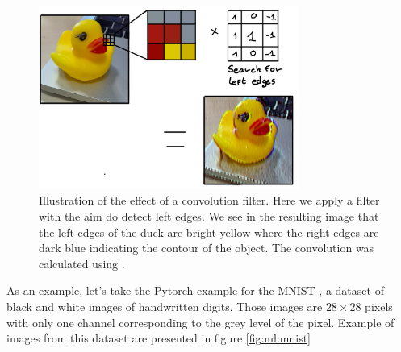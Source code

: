 \documentclass[../main.tex]{subfiles}
\begin{document}
\begin{figure}[ht]
  \centering
  \includegraphics[height=6cm]{images/ml/convolution_exammple.jpg}
  \caption{Illustration of the effect of a convolution filter. Here we apply a filter with the aim do detect left edges. We see in the resulting image that the left edges of the duck are bright yellow where the right edges are dark blue indicating the contour of the object. The convolution was calculated using \cite{allen_generic-github-userimage-convolution-playground_2024}.}
  \label{fig:ml:conv_filter}
\end{figure}

As an example, let's take the Pytorch \cite{ansel_pytorch_2024} example for the MNIST \cite{lecun_gradient-based_1998}, a dataset of black and white images of handwritten digits. Those images are $28 \times 28$ pixels with only one channel corresponding to the grey level of the pixel. Example of images from this dataset are presented in figure \ref{fig:ml:mnist}
\end{document}
